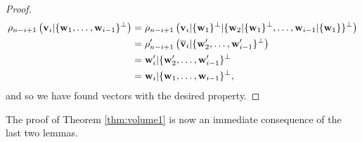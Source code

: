 \documentclass{amsart}
\theoremstyle{definition}
\theoremstyle{remark}
\numberwithin{equation}{section}
\begin{document}
\begin{proof}
\begin{equation*}
\begin{split}
      \rho_{n-i+1}\left({\bf v}_{i}|\{{\bf w}_1,\dots,{\bf w}_{i-1}\}^\perp\right) &= \rho_{n-i+1}\left({\bf v}_{i}|\{{\bf w}_1\}^\perp |\{{\bf w}_2|\{{\bf w}_1\}^\perp,\dots,{\bf w}_{i-1}|\{{\bf w}_1\}\}^\perp\right)\\ 
      &= \rho_{n-i+1}'\left(\overline{\bf v}_{i}|\{{\bf w}'_2,\dots,{\bf w}_{i-1}'\}^\perp\right)\\ 
      &={\bf w}_i'|\{{\bf w}_2',\dots,{\bf w}_{i-1}'\}^\perp \\
      &={\bf w}_i|\{{\bf w}_1,\dots,{\bf w}_{i-1}\}^\perp, 
      \end{split} 
\end{equation*}
and so we have found vectors with the desired property.  
\end{proof}



The proof of Theorem \ref{thm:volume1} is now an immediate consequence of the last two lemmas.
\end{document}

